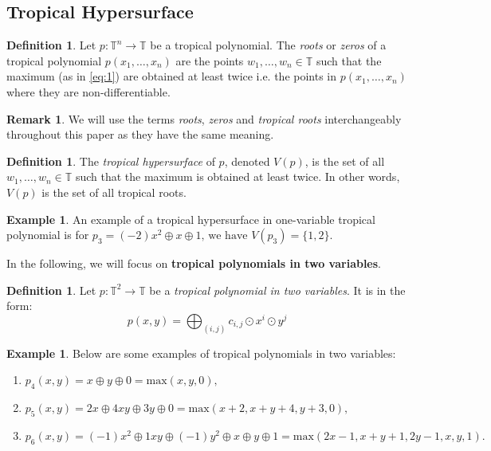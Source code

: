 \documentclass[]{article}
\theoremstyle{definition}
\numberwithin{equation}{section}
\newtheorem{defn}[thm]{Definition}
\newtheorem{examp}[thm]{Example}
\newtheorem{rmk}[thm]{Remark}
\renewcommand{\.}{\,.}
\begin{document}
\subsection{Tropical Hypersurface}
\begin{defn} Let $p:\mathbb{T}^n \to \mathbb{T}$ be a tropical polynomial. The \emph{roots} or \emph{zeros} of a tropical polynomial $p(x_1,\ldots,x_n)$ are the points $w_1,\ldots,w_n\in\mathbb{T}$ such that the maximum  (as in \ref{eq:1}) are obtained at least twice i.e. the points in $p(x_1,\ldots,x_n)$ where they are non-differentiable. \label{rooots}
	\end{defn}
\begin{rmk} We will use the terms \emph{roots}, \emph{zeros} and \emph{tropical roots} interchangeably throughout this paper as they have the same meaning.
	\end{rmk}
\begin{defn}
	The \emph{tropical hypersurface} of $p$, denoted $V(p)$, is the set of all $w_1,\ldots,w_n\in\mathbb{T}$ such that the maximum is obtained at least twice. In other words, $V(p)$ is the set of all tropical roots.  
	\end{defn}
\begin{examp} An example of a tropical hypersurface in one-variable tropical polynomial is for $p_3=(-2)x^2\oplus x \oplus 1 \textrm{, we have  }V(p_3)=\{1,2\}.$
\end{examp}
\hspace{3mm} In the following, we will focus on \textbf{tropical polynomials in two variables}.
\begin{defn}
	Let $p:\mathbb{T}^2 \to \mathbb{T}$ be a \emph{tropical polynomial in two variables}. It is in the form:
	\begin{equation}
		p(x,y)=\bigoplus_{(i,j)}c_{i,j} \odot x^i \odot y^j
	\end{equation}
\end{defn}
\begin{examp} Below are some examples of tropical polynomials in two variables: 
	\begin{enumerate}[noitemsep,topsep=-6pt] \label{con}
		\item \vspace{0.75mm}
		$ p_4(x,y)=x \oplus y\oplus0 =\textrm{max}(x,y,0),$ \vspace{2mm}
		\item $ p_5(x,y)=2x \oplus 4xy \oplus 3y \oplus 0 =\textrm{max}(x+2,x+y+4,y+3,0), $\vspace{2mm}
	\item $ p_6(x,y)=(-1)x^2 \oplus 1xy \oplus (-1)y^2 \oplus x \oplus y\oplus 1 =\textrm{max}(2x-1,x+y+1,2y-1,x,y,1).$
	\end{enumerate} \label{eax}
\end{examp}
\end{document}
